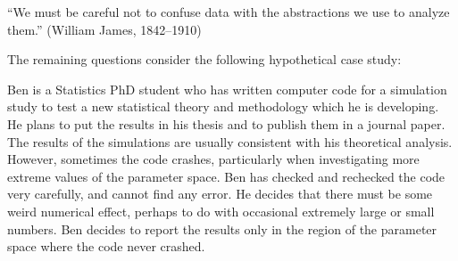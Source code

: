 \documentclass[12pt]{beamer}
\newcommand\gap{\vspace{5mm}}
\begin{document}
\begin{frame}

``We must be careful not to confuse data with the abstractions we use to analyze them.'' (William James, 1842--1910)


\gap


\end{frame}








\begin{frame}

The remaining questions consider the following hypothetical case study:

Ben is a Statistics PhD student who has written computer code for a simulation study to test a new statistical theory and methodology which he is developing.
He plans to put the results in his thesis and to publish them in a journal paper.
The results of the simulations are usually consistent with his theoretical analysis. 
However, sometimes the code crashes, particularly when investigating more extreme values of the parameter space.
Ben has checked and rechecked the code very carefully, and cannot find any error.
He decides that there must be some weird numerical effect, perhaps to do with occasional extremely large or small numbers.
Ben decides to report the results only in the region of the parameter space where the code never crashed. 

\end{frame}
\end{document}
